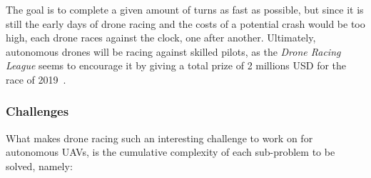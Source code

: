The goal is to complete a given amount of turns as fast as possible, but since
it is still the early days of drone racing and the costs of a potential crash
would be too high, each drone races against the clock, one after another.
Ultimately, autonomous drones will be racing against skilled pilots, as the
\emph{Drone Racing League} seems to encourage it by giving a total prize of 2
millions USD for the race of 2019~\cite{LockheedDRL}.


\subsubsection{Challenges}

What makes drone racing such an interesting challenge to work on for autonomous
UAVs, is the cumulative complexity of each sub-problem to be solved, namely:

